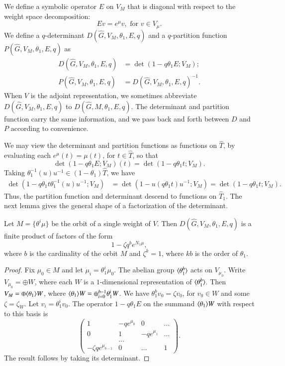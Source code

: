 We define a symbolic operator $E$ on $V_M$ that is diagonal with
respect to the weight space decomposition:
\[
E v = e^{\mu} v, \text{ for } v \in V_\mu.
\]
We define a $q$-determinant $D(\hat G,V_M,\theta_1,E,q)$ and a
$q$-partition function $P(\hat G,V_M,\theta_1,E,q)$ as
\begin{align}\label{eqn:det}
D(\hat G,V_M,\theta_1,E,q) &= \det(1- q \theta_1 E;V_M);\\ 
P(\hat G,V_M,\theta_1,E,q) &= D(\hat G,V_M,\theta_1,E,q)^{-1}.
\end{align}
When $V$ is the adjoint representation, we sometimes abbreviate
$D(\hat G,V_M,\theta_1,E,q)$ to $D(\hat G,M,\theta_1,E,q)$.
The determinant and partition function carry the same information,
and we pass back and forth between $D$ and $P$ according to convenience.


We may view the determinant and partition functions as functions on
$\hat T$, by evaluating each $e^\mu (t) = \mu(t)$, for $t\in \hat T$,
so that
\[
\det(1- q\theta_1 E;V_M)(t) = \det(1-q\theta_1 t;V_M).
\]
Taking $\theta_1^{-1}(u) u^{-1}\in (1-\theta_1)\hat T$, we have
\begin{align*}
\det (1-q \theta_1 t \theta_1^{-1}(u) u^{-1};V_M) 
&= \det(1- u (q \theta_1 t ) u^{-1};V_M) = \det(1-q\theta_1 t;V_M).
\end{align*}
Thus, the partition function and determinant descend to functions on
$\hat T_1$.  The next lemma gives the general shape of a factorization
of the determinant.

\begin{lemma}\label{lemma:fact}  
  Let $M = \{\theta^i\mu\}$ be the orbit of a single weight of $V$.
  Then $D(\hat G,V_M,\theta_1,E,q)$ is a finite product of factors of
  the form
\[
1 - \zeta q^b e^{N_1\mu},
\]
where $b$ is the cardinality of the orbit $M$ and $\zeta^k=1$, where
$k b$ is the order of $\theta_1$.
\end{lemma}

\begin{proof} Fix $\mu_0\in M$ and let $\mu_i = \theta_1^i \mu_0$.
  The abelian group $\langle{\theta_1^b}\rangle$ acts on $V_{\mu_0}$.  Write
  $V_{\mu_0} = \oplus W$, where each $W$ is a $1$-dimensional
  representation of $\langle{\theta_1^b}\rangle$.  Then $V_M = \oplus
  \langle{\theta_1}\rangle W$, where $\langle{\theta_1}\rangle W = \oplus_{i=0}^{b-1}
  \theta_1^i W$.  We have $\theta_1^b v_0 = \zeta v_0$, for $v_0\in W$
  and some $\zeta = \zeta_W$.  Let $v_i = \theta_1^i v_0$.  The
  operator $1 - q \theta_1 E$ on the summand $\langle{\theta_1}\rangle W$ with
  respect to this basis is
\[
\begin{pmatrix}
1 & -q e^{\mu_0} & 0 & \ldots\\
0 & 1 & -q e^{\mu_1} & \ldots\\
   & \ldots & & \\
-\zeta  q e^{\mu_{b-1}} & 0 & \ldots & 1
\end{pmatrix}.
\]
The result follows by taking its determinant.
\end{proof}

